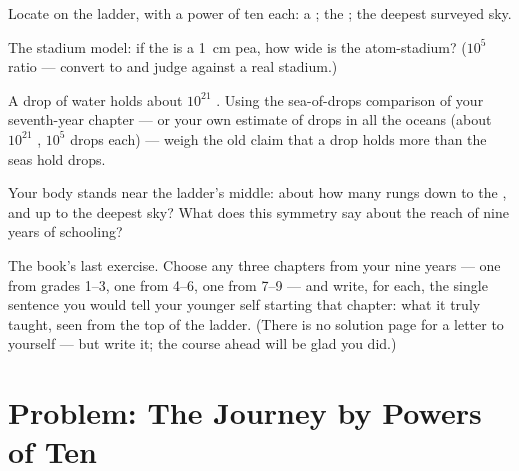 \begin{exercise}[$\star$]\label{exo:g9:atoms-to-galaxies:8}
Locate on the ladder, with a power of ten each: a ;
the ; the deepest surveyed sky.
\end{exercise}

\begin{exercise}[$\star\star$]\label{exo:g9:atoms-to-galaxies:9}
The stadium model: if the  is a \qty{1}{cm} pea, how
wide is the atom-stadium? ($10^{5}$ ratio --- convert to
 and judge against a real stadium.)
\end{exercise}

\begin{exercise}[$\star\star$]\label{exo:g9:atoms-to-galaxies:10}
A drop of water holds about $10^{21}$ . Using the
sea-of-drops comparison of your seventh-year chapter ---
or your own estimate of drops in all the oceans (about
$10^{21}$ , $10^{5}$ drops each) --- weigh the old
claim that a drop holds more  than the seas hold
drops.
\end{exercise}

\begin{exercise}[$\star\star$]\label{exo:g9:atoms-to-galaxies:11}
Your body stands near the ladder's middle: about how many
rungs down to the , and up to the deepest sky? What
does this symmetry say about the reach of nine years of
schooling?
\end{exercise}

\begin{exercise}[$\star\star\star$]\label{exo:g9:atoms-to-galaxies:12}
The book's last exercise. Choose any three chapters from
your nine years --- one from grades 1--3, one from 4--6,
one from 7--9 --- and write, for each, the single sentence
you would tell your younger self starting that chapter:
what it truly taught, seen from the top of the ladder.
(There is no solution page for a letter to yourself ---
but write it; the course ahead will be glad you did.)
\end{exercise}

\section{Problem: The Journey by Powers of Ten}

